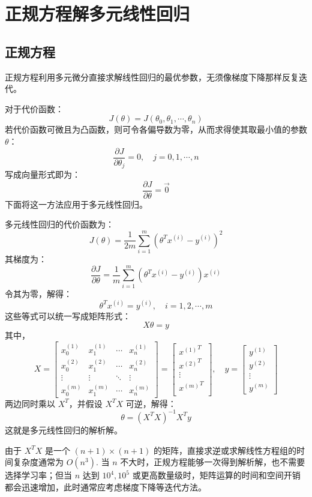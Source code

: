 \section{正规方程解多元线性回归}
\label{sec:chapter3}

\subsection{正规方程}

正规方程利用多元微分直接求解线性回归的最优参数，无须像梯度下降那样反复迭代。

对于代价函数：
\[
J(\theta)=J(\theta_0, \theta_1,\cdots, \theta_n)
\]
若代价函数可微且为凸函数，则可令各偏导数为零，从而求得使其取最小值的参数 $\theta$：
\[
\frac{\partial J}{\partial \theta_j}=0,\quad j=0,1,\cdots,n
\]
写成向量形式即为：
\[
\frac{\partial J}{\partial \theta}=\vec 0
\]
下面将这一方法应用于多元线性回归。

多元线性回归的代价函数为：
\[
J(\theta)=\frac{1}{2m}\sum_{i=1}^m\left(\theta^Tx^{(i)}-y^{(i)}\right)^2
\]
其梯度为：
\[
\frac{\partial J}{\partial \theta}=\frac{1}{m}\sum_{i=1}^m\left(\theta^Tx^{(i)}-y^{(i)}\right)x^{(i)}
\]
令其为零，解得：
\[
\theta^Tx^{(i)}=y^{(i)},\quad i=1,2,\cdots,m
\]
这些等式可以统一写成矩阵形式：
\[
X\theta=y
\]
其中，
\[
X=\begin{bmatrix}x_0^{(1)}&x_1^{(1)}&\cdots& x_n^{(1)}\\x_0^{(2)}&x_1^{(2)}&\cdots& x_n^{(2)}\\\vdots&\vdots&\ddots&\vdots\\x_0^{(m)}&x_1^{(m)}&\cdots& x_n^{(m)}\end{bmatrix}=\begin{bmatrix}{x^{(1)}}^T\\{x^{(2)}}^T\\\vdots\\{x^{(m)}}^T\\\end{bmatrix},\quad y=\begin{bmatrix}y^{(1)}\\y^{(2)}\\\vdots\\y^{(m)}\end{bmatrix}
\]
两边同时乘以 $X^T$，并假设 $X^TX$ 可逆，解得：
\[
\theta=(X^TX)^{-1}X^Ty
\]
这就是多元线性回归的解析解。

由于 $X^TX$ 是一个 $(n+1)\times(n+1)$ 的矩阵，直接求逆或求解线性方程组的时间复杂度通常为 $O(n^3)$. 当 $n$ 不大时，正规方程能够一次得到解析解，也不需要选择学习率；但当 $n$ 达到 $10^4,10^5$ 或更高数量级时，矩阵运算的时间和空间开销都会迅速增加，此时通常应考虑梯度下降等迭代方法。


